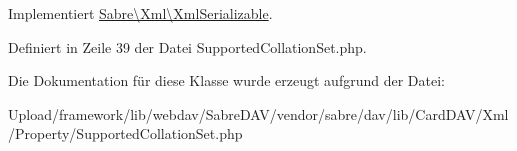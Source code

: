 Implementiert \mbox{\hyperlink{interface_sabre_1_1_xml_1_1_xml_serializable_aa78f3ee43aa699be8347181653a53d8c}{Sabre\textbackslash{}\+Xml\textbackslash{}\+Xml\+Serializable}}.



Definiert in Zeile 39 der Datei Supported\+Collation\+Set.\+php.



Die Dokumentation für diese Klasse wurde erzeugt aufgrund der Datei\+:\begin{DoxyCompactItemize}
\item 
Upload/framework/lib/webdav/\+Sabre\+D\+A\+V/vendor/sabre/dav/lib/\+Card\+D\+A\+V/\+Xml/\+Property/Supported\+Collation\+Set.\+php\end{DoxyCompactItemize}
